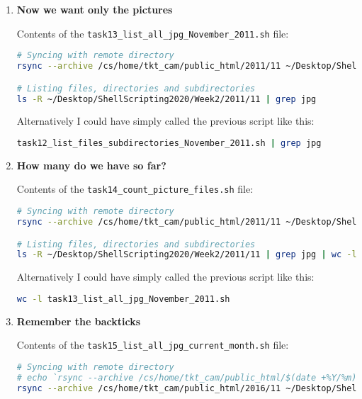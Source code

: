 \documentclass[9pt]{article}
\begin{document}
\begin{enumerate}
\begin{lstlisting}[language=bash,breaklines=true]
# Listing files, directories and subdirectories
ls -R ~/Desktop/ShellScripting2020/Week2/2011/11
		\end{lstlisting}
	
	\item \textbf{Now we want only the pictures}
	
		Contents of the \texttt{task13\_list\_all\_jpg\_November\_2011.sh} file:
		\begin{lstlisting}[language=bash,breaklines=true]
# Syncing with remote directory
rsync --archive /cs/home/tkt_cam/public_html/2011/11 ~/Desktop/ShellScripting2020/Week2/2011 --stats

# Listing files, directories and subdirectories
ls -R ~/Desktop/ShellScripting2020/Week2/2011/11 | grep jpg
		\end{lstlisting}
		
		Alternatively I could have simply called the previous script like this:
		\begin{lstlisting}[language=bash,breaklines=true]
task12_list_files_subdirectories_November_2011.sh | grep jpg               
		\end{lstlisting}

	\item \textbf{How many do we have so far?}
	
		Contents of the \texttt{task14\_count\_picture\_files.sh} file:
		\begin{lstlisting}[language=bash,breaklines=true]
# Syncing with remote directory
rsync --archive /cs/home/tkt_cam/public_html/2011/11 ~/Desktop/ShellScripting2020/Week2/2011 --stats

# Listing files, directories and subdirectories
ls -R ~/Desktop/ShellScripting2020/Week2/2011/11 | grep jpg | wc -l
		\end{lstlisting}

		Alternatively I could have simply called the previous script like this:
		\begin{lstlisting}[language=bash,breaklines=true]
wc -l task13_list_all_jpg_November_2011.sh
		\end{lstlisting}
	
	\item \textbf{Remember the backticks}
	
		Contents of the \texttt{task15\_list\_all\_jpg\_current\_month.sh} file:
		\begin{lstlisting}[language=bash,breaklines=true]
# Syncing with remote directory
# echo `rsync --archive /cs/home/tkt_cam/public_html/$(date +%Y/%m) ~/Desktop/ShellScripting2020/Week2/$(date +%Y) --stats`
rsync --archive /cs/home/tkt_cam/public_html/2016/11 ~/Desktop/ShellScripting2020/Week2/2016/11 --stats


\end{lstlisting}
\end{enumerate}
\end{document}

